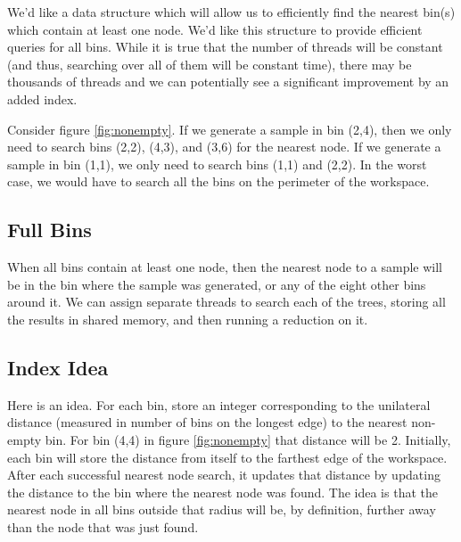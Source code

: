 \begin{figure}[h]
\begin{centering}
    \texttt{[image: \\figfile\{fig/nonempty\_search]}}
    \caption{Non-empty Search}
    \label{fig:nonempty}
\end{centering}
\end{figure}


We'd like a data structure which will allow us to efficiently find the nearest bin(s) which contain at least one node. We'd like this structure to provide efficient queries for all bins. While it is true that the number of threads will be constant (and thus, searching over all of them will be constant time), there may be thousands of threads and we can potentially see a significant improvement by an added index. 

Consider figure \ref{fig:nonempty}. If we generate a sample in bin (2,4), then we only need to search bins (2,2), (4,3), and (3,6) for the nearest node. If we generate a sample in bin (1,1), we only need to search bins (1,1) and (2,2). In the worst case, we would have to search all the bins on the perimeter of the workspace. 

\subsection{Full Bins}

When all bins contain at least one node, then the nearest node to a sample will be in the bin where the sample was generated, or any of the eight other bins around it. We can assign separate threads to search each of the trees, storing all the results in shared memory, and then running a reduction on it. 

\subsection{Index Idea}

Here is an idea. For each bin, store an integer corresponding to the unilateral distance (measured in number of bins on the longest edge) to the nearest non-empty bin. For bin (4,4) in figure \ref{fig:nonempty} that distance will be 2. Initially, each bin will store the distance from itself to the farthest edge of the workspace. After each successful nearest node search, it updates that distance by updating the distance to the bin where the nearest node was found. The idea is that the nearest node in all bins outside that radius will be, by definition, further away than the node that was just found. 

